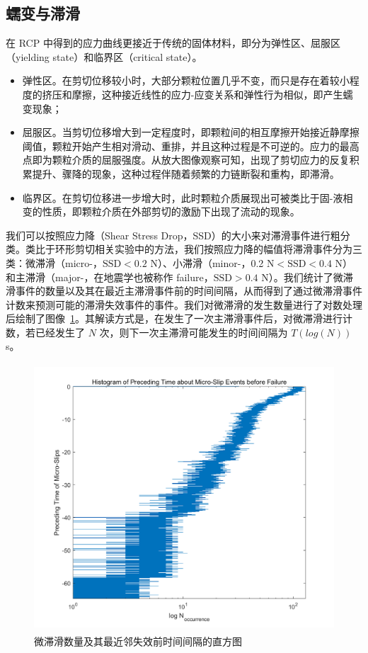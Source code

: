 \subsection{蠕变与滞滑}

在 RCP 中得到的应力曲线更接近于传统的固体材料，即分为弹性区、屈服区（yielding state）和临界区（critical state）。

\begin{itemize}
  \item 弹性区。在剪切位移较小时，大部分颗粒位置几乎不变，而只是存在着较小程度的挤压和摩擦，这种接近线性的应力-应变关系和弹性行为相似，即产生蠕变现象；
  \item 屈服区。当剪切位移增大到一定程度时，即颗粒间的相互摩擦开始接近静摩擦阈值，颗粒开始产生相对滑动、重排，并且这种过程是不可逆的。应力的最高点即为颗粒介质的屈服强度。从放大图像观察可知，出现了剪切应力的反复积累提升、骤降的现象，这种过程伴随着频繁的力链断裂和重构，即滞滑。
  \item 临界区。在剪切位移进一步增大时，此时颗粒介质展现出可被类比于固-液相变的性质，即颗粒介质在外部剪切的激励下出现了流动的现象。
\end{itemize}

我们可以按照应力降（Shear Stress Drop，SSD）的大小来对滞滑事件进行粗分类。类比于环形剪切相关实验中的方法，我们按照应力降的幅值将滞滑事件分为三类：微滞滑（micro-，$\text{SSD}<0.2$ \unit{\newton}）、小滞滑（minor-，0.2 \unit{\newton}$<\text{SSD}<0.4$ \unit{\newton}）和主滞滑（major-，在地震学也被称作 failure，$\text{SSD}>0.4$ \unit{\newton}）。我们统计了微滞滑事件的数量以及其在最近主滞滑事件前的时间间隔，从而得到了通过微滞滑事件计数来预测可能的滞滑失效事件的事件。我们对微滞滑的发生数量进行了对数处理后绘制了图像~\ref{fig:preceding_interval}。其解读方式是，在发生了一次主滞滑事件后，对微滞滑进行计数，若已经发生了 $N$ 次，则下一次主滞滑可能发生的时间间隔为 $T(log{(N)})$ \unit{s}。

\begin{figure}[!htp]
  \centering
  \includegraphics[height=10cm]{figures/4_preceding_interval.png}
  \caption{微滞滑数量及其最近邻失效前时间间隔的直方图}
  \label{fig:preceding_interval}
\end{figure}

